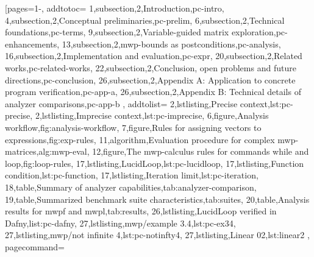 [pages={1-},
    addtotoc={
        1,subsection,2,{Introduction},pc-intro,
        4,subsection,2,{Conceptual preliminaries},pc-prelim,
        6,subsection,2,{Technical foundations},pc-terms,
        9,subsection,2,{Variable-guided matrix exploration},pc-enhancements,
        13,subsection,2,{mwp-bounds as postconditions},pc-analysis,
        16,subsection,2,{Implementation and evaluation},pc-expr,
        20,subsection,2,{Related works},pc-related-works,
        22,subsection,2,{Conclusion, open problems and future directions},pc-conclusion,
        26,subsection,2,{Appendix A: Application to concrete program verification},pc-app-a,
        26,subsection,2,{Appendix B: Technical details of analyzer comparisons},pc-app-b
    }, addtolist={
        2,lstlisting,{Precise context},lst:pc-precise,
        2,lstlisting,{Imprecise context},lst:pc-imprecise,
        6,figure,{Analysis workflow},fig:analysis-workflow,
        7,figure,{Rules for assigning vectors to expressions},fig:exp-rules,
        11,algorithm,{Evaluation procedure for complex mwp-matrices},alg:mwp-eval,
        12,figure,{The mwp-calculus rules for commands while and loop},fig:loop-rules,
        17,lstlisting,{LucidLoop},lst:pc-lucidloop,
        17,lstlisting,{Function condition},lst:pc-function,
        17,lstlisting,{Iteration limit},lst:pc-iteration,
        18,table,{Summary of analyzer capabilities},tab:analyzer-comparison,
        19,table,{Summarized benchmark suite characteristics},tab:suites,
        20,table,{Analysis results for mwpf and mwpl},tab:results,
        26,lstlisting,{LucidLoop verified in Dafny},list:pc-dafny,
        27,lstlisting,{mwp/example 3.4},lst:pc-ex34,
        27,lstlisting,{mwp/not infinite 4},lst:pc-notinfty4,
        27,lstlisting,{Linear 02},lst:linear2
    }, pagecommand={\thispagestyle{empty}%
}
